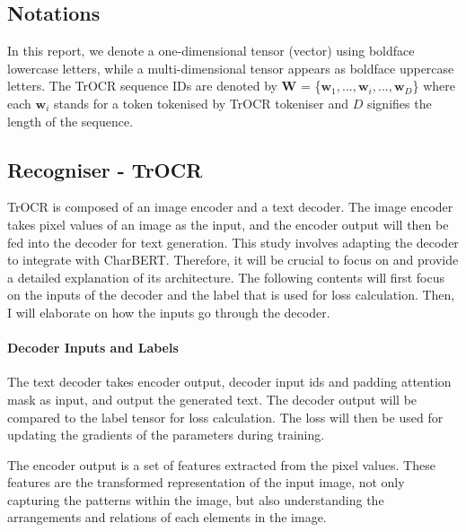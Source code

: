 \subsection{Notations}
\label{subsec:3_Notations}
In this report, we denote a one-dimensional tensor (vector) using boldface lowercase letters, while a multi-dimensional tensor appears as boldface uppercase letters. The TrOCR sequence IDs are denoted by $\mathbf{W}$ = \{$\mathbf{w}_1, ..., \mathbf{w}_i, ..., \mathbf{w}_D$\} where each $\mathbf{w}_i$ stands for a token tokenised by TrOCR tokeniser and $D$ signifies the length of the sequence. 

\subsection{Recogniser - TrOCR}
\label{subsec:3_recogniser_trocr}
TrOCR is composed of an image encoder and a text decoder. The image encoder takes pixel values of an image as the input, and the encoder output will then be fed into the decoder for text generation. This study involves adapting the decoder to integrate with CharBERT.  Therefore, it will be crucial to focus on and provide a detailed explanation of its architecture. The following contents will first focus on the inputs of the decoder and the label that is used for loss calculation. Then, I will elaborate on how the inputs go through the decoder.

\paragraph*{Decoder Inputs and Labels}
\label{par:3_decoder_inputs_and_labels}
The text decoder takes encoder output, decoder input ids and padding attention mask as input, and output the generated text. The decoder output will be compared to the label tensor for loss calculation. The loss will then be used for updating the gradients of the parameters during training.

The encoder output is a set of features extracted from the pixel values. These features are the transformed representation of the input image, not only capturing the patterns within the image, but also understanding the arrangements and relations of each elements in the image.

